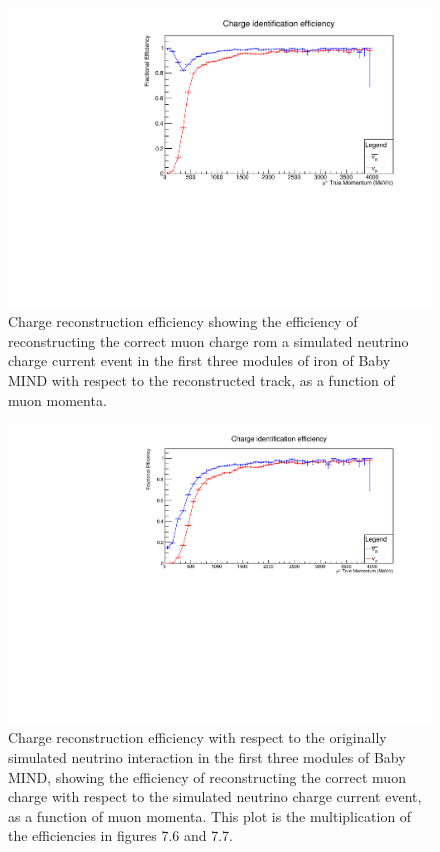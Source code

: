 \begin{figure}[h!]
\centering
\includegraphics[width=.9\textwidth]{figures/NeutrinoChap/Neutrino/T2KIronChargeEff.pdf}
\caption{Charge reconstruction efficiency showing the efficiency of reconstructing the correct muon charge rom a simulated neutrino charge current event in the first three modules of iron of Baby MIND with respect to the reconstructed track, as a function of muon momenta.}
\label{fig:IronMINDfittedcharge}
\end{figure}

\begin{figure}[h!]
\centering
\includegraphics[width=.9\textwidth]{figures/NeutrinoChap/NuFactTalk/fix3.pdf}
\caption{Charge reconstruction efficiency with respect to the originally simulated neutrino interaction in the first three modules of Baby MIND, showing the efficiency of reconstructing the correct muon charge with respect to the simulated neutrino charge current event, as a function of muon momenta. This plot is the multiplication of the efficiencies in figures 7.6 and 7.7. }
\label{fig:IronMINDCombined}
\end{figure}

